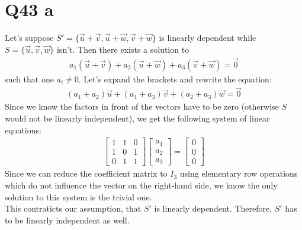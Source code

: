 \documentclass{article}
\begin{document}
\section*{Q43 a}
Let's suppose $S'=\{\vec u+\vec v, \vec u+\vec w, \vec v+\vec w\}$ is linearly dependent 
while $S=\{\vec u, \vec v, \vec w\}$ isn't. Then there exists a solution to
\begin{align}
    a_1(\vec u+\vec v) + a_2(\vec u + \vec w) + a_3(\vec v + \vec w) = \vec 0
\end{align}
such that one $a_i\not=0$. Let's expand the brackets and rewrite the equation:
\begin{align}
    (a_1+a_2)\vec u + (a_1+a_3) \vec v + (a_2 + a_3) \vec w = \vec 0
\end{align}
Since we know the factors in front of the vectors have to be zero (otherwise $S$ would not be linearly independent), we get the following system of linear equations:
\begin{align}
    \begin{bmatrix}
        1 &1 &0\\
        1 &0 &1\\
        0 &1 &1
    \end{bmatrix}
    \begin{bmatrix}
        a_1\\a_2\\a_3
    \end{bmatrix}
    = \begin{bmatrix}
        0 \\ 0 \\ 0
    \end{bmatrix}
\end{align}
Since we can reduce the coefficient matrix to $I_3$ using elementary row operations which do not influence the vector on the right-hand side, we know the only solution to this system is the trivial one.\\
This contraticts our assumption, that $S'$ is linearly dependent. Therefore, $S'$ has to be linearly independent as well.
\end{document}
